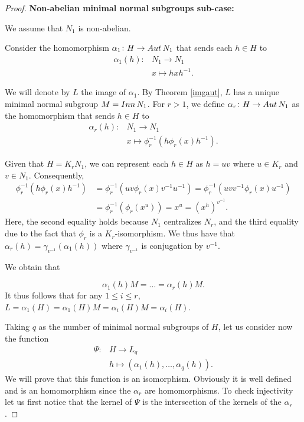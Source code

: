 \begin{proof}
\vspace{\baselineskip}
\noindent
\textbf{Non-abelian minimal normal subgroups sub-case:}
\vspace{\baselineskip}

We assume that $N_1$ is non-abelian. 

Consider the homomorphism $\alpha_1 \colon H \rightarrow Aut\, {N}_1$ that sends each $h \in H$ to
\begin{align*}
    \alpha_1(h) \colon &N_1 \rightarrow N_1 \\
                    &x \mapsto hxh^{-1}.
\end{align*}

We will denote by $L$ the image of $\alpha_1$. By Theorem \ref{imgaut}, $L$ has a unique minimal normal subgroup $M = Inn\, {N}_1$. For $r > 1$, we define $\alpha_r \colon H \rightarrow Aut\, {N}_1$ as the homomorphism that sends $h \in H$ to
\begin{align*}
    \alpha_r(h) \colon &N_1 \rightarrow N_1 \\
                    &x \mapsto \phi_r^{-1}(h\phi_r(x)h^{-1}).
\end{align*}

Given that $H = K_rN_1$, we can represent each $h \in H$ as $h = uv$ where $u \in K_r$ and $v \in N_1$. Consequently,
\begin{align*}
    \phi_r^{-1}(h\phi_r(x)h^{-1}) &= \phi_r^{-1}(uv\phi_r(x)v^{-1}u^{-1}) = \phi_r^{-1}(uvv^{-1}\phi_r(x)u^{-1}) \\
    &= \phi_r^{-1}(\phi_r(x^{u})) = x^u = (x^h)^{v^{-1}}.
\end{align*}
Here, the second equality holds because $N_1$ centralizes $N_r$, and the third equality due to the fact that $\phi_r$ is a $K_r$-isomorphism.
We thus have that $\alpha_r(h) = \gamma_{v^{-1}}(\alpha_1(h))$ where $\gamma_{v^{-1}}$ is conjugation by $v^{-1}$.

We obtain that 

$$
\alpha_1(h)M = \ldots  = \alpha_r(h)M. 
$$
It thus follows that for any $1 \le i \le r$, $L = \alpha_1(H) = \alpha_1(H)M = \alpha_i(H)M = \alpha_i(H)$.

Taking $q$ as the number of minimal normal subgroups of $H$, let us consider now the function
\begin{align*}
    \Psi \colon &H \rightarrow L_q \\
                &h \mapsto (\alpha_1(h),\ldots , \alpha_q(h)).
\end{align*}
We will prove that this function is an isomorphism.
Obviously it is well defined and is an homomorphism since the $\alpha_r$ are homomorphisms. To check injectivity let us first notice that the kernel of $\Psi$ is the intersection of the kernels of the $\alpha_r$. 


\end{proof}
